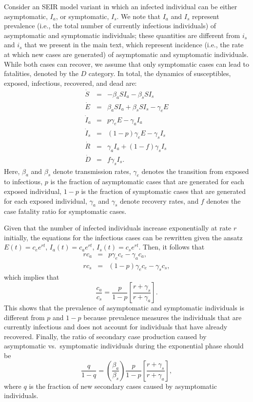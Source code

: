 Consider an SEIR model variant in which an infected individual can be either asymptomatic, $I_a$, or symptomatic, $I_s$.
We note that $I_a$ and $I_s$ represent prevalence (i.e., the total number of currently infectious individuals) of asymptomatic and symptomatic individuals; these quantities are different from $i_s$ and $i_s$ that we present in the main text, which represent incidence (i.e., the rate at which new cases are generated)  of asymptomatic and symptomatic individuals.
While both cases can recover, we assume that only symptomatic cases can lead to fatalities, denoted
by the $D$ category.
In total, the dynamics of susceptibles, exposed, infectious, recovered, and dead are:
\begin{eqnarray}
\dot{S}&=&-\beta_a S I_a -\beta_s S I_s \\
\dot{E}&=&\beta_a S I_a +\beta_s S I_s -\gamma_e E\\
\dot{I}_a&=&p\gamma_e E-\gamma_a I_a\\
\dot{I}_s&=&(1-p)\gamma_e E-\gamma_s I_s\\
\dot{R}&=&\gamma_a I_a + (1-f)\gamma_s I_s \\
\dot{D}&=&f\gamma_s I_s.
\end{eqnarray}
Here, $\beta_a$ and $\beta_s$ denote transmission rates,
$\gamma_e$ denotes the transition from exposed to infectious,
$p$ is the fraction of asymptomatic cases that
are generated for each exposed individual,
$1-p$ is the fraction of symptomatic cases that
are generated for each exposed individual,
$\gamma_a$ and $\gamma_s$ denote recovery rates,
and $f$ denotes the case fatality ratio for symptomatic cases.

Given that the number of infected individuals increase exponentially at rate $r$ initially, the equations
for the infectious cases can be rewritten given the ansatz
$E(t)=c_e e^{rt}$,
$I_a(t)=c_a e^{rt}$,
$I_s(t)=c_s e^{rt}$.
Then, it follows that 
\begin{eqnarray}
r c_a&=&p\gamma_e c_e-\gamma_a c_a,\\
r c_s&=&(1-p)\gamma_e c_e-\gamma_s c_s,
\end{eqnarray} 
which implies that
\begin{equation}
\frac{c_a}{c_s}=\frac{p}{1-p}\left[\frac{r+\gamma_s}{r+\gamma_a}\right].
\end{equation}
This shows that the prevalence of asymptomatic and symptomatic individuals is different from $p$ and $1-p$ because prevalence measures the individuals that are currently infectious and does not account for individuals that have already recovered.
Finally, the ratio of secondary case production caused by asymptomatic vs.~symptomatic
individuals during the exponential phase should be
\begin{equation}
\frac{q}{1-q} = \left(\frac{\beta_a}{\beta_s}\right)\frac{p}{1-p}\left[\frac{r+\gamma_s}{r+\gamma_a}\right],
\end{equation}
where $q$ is the fraction of new secondary cases caused by
asymptomatic individuals.

